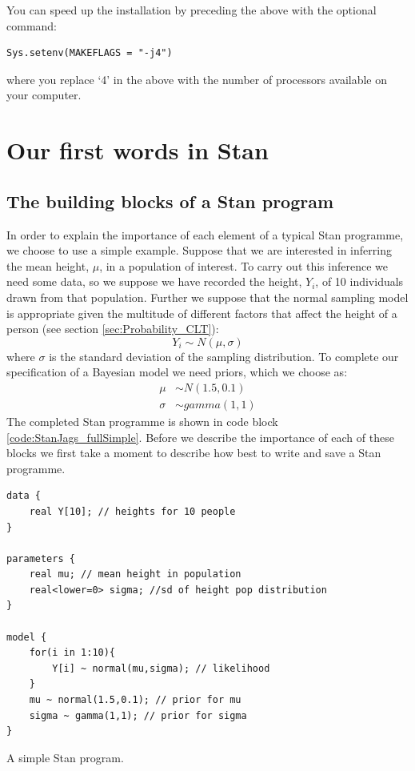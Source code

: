 \documentclass[11pt,fullpage]{book}
\begin{document}
You can speed up the installation by preceding the above with the optional command:
\begin{verbatim}
Sys.setenv(MAKEFLAGS = "-j4") 
\end{verbatim}

where you replace `4' in the above with the number of processors available on your computer.

\section{Our first words in Stan}
\subsection{The building blocks of a Stan program}
In order to explain the importance of each element of a typical Stan programme, we choose to use a simple example. Suppose that we are interested in inferring the mean height, $\mu$, in a population of interest. To carry out this inference we need some data, so we suppose we have recorded the height, $Y_i$, of 10 individuals drawn from that population. Further we suppose that the normal sampling model is appropriate given the multitude of different factors that affect the height of a person (see section \ref{sec:Probability_CLT}):
%
\begin{equation}
Y_i \sim N(\mu,\sigma)
\end{equation} 
%
where $\sigma$ is the standard deviation of the sampling distribution. To complete our specification of a Bayesian model we need priors, which we choose as:
\begin{align}
\mu &\sim N(1.5,0.1)\\
\sigma &\sim gamma(1,1)
\end{align}
The completed Stan programme is shown in code block \ref{code:StanJags_fullSimple}. Before we describe the importance of each of these blocks we first take a moment to describe how best to write and save a Stan programme.

\begin{listing}[H]
	\begin{verbatim}
data {
    real Y[10]; // heights for 10 people
}

parameters {
    real mu; // mean height in population
    real<lower=0> sigma; //sd of height pop distribution
}

model {
    for(i in 1:10){
        Y[i] ~ normal(mu,sigma); // likelihood
    }
    mu ~ normal(1.5,0.1); // prior for mu
    sigma ~ gamma(1,1); // prior for sigma
}
	\end{verbatim}
	\caption{A simple Stan program.}
	\label{code:StanJags_fullSimple}
	\end{listing}
\end{document}
